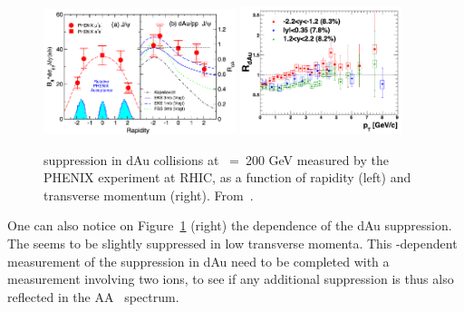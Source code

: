 \begin{figure}[th]
\begin{center}
  \includegraphics[width=0.5\textwidth]{Chapters/pQuarkonia/Phenix_rday.png}
  \includegraphics[width=0.42\textwidth]{Chapters/pQuarkonia/Phenix_rdapt.png}
  \caption{\Jpsi suppression in dAu collisions at \snn~=~200 GeV
    measured by the PHENIX experiment at RHIC, as a function of
    \Jpsi rapidity (left) and transverse momentum (right). From~\cite{jpsiphenixdAuy,jpsiphenixdAupt}.}
  \label{fig:dAuphenix}
\end{center}
\end{figure}



One can also notice on Figure~\ref{fig:dAuphenix} (right) the \pt
dependence of the \Jpsi dAu suppression. The \Jpsi seems to be
slightly suppressed in low transverse momenta. This \pt-dependent
measurement of the suppression in dAu need to be completed with a
measurement involving two ions, to see if any additional suppression
is thus also reflected in the AA \pt\ spectrum.



